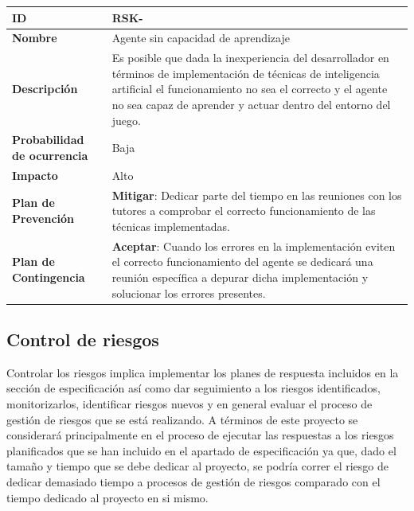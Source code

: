\begin{center}
	\begin{tabular}{ | p{5.6cm} | p{8.5cm} | } 
		\hline
		
		\textbf{ID} & RSK-\arabic{contador_riesgos}
		{contador_riesgos} \\
		
		\hline 
		\textbf{Nombre} &
		Agente sin capacidad de aprendizaje\\ 
		
		\hline
		\textbf{Descripción} & 
		Es posible que dada la inexperiencia del desarrollador en términos de implementación de técnicas de inteligencia artificial el funcionamiento no sea el correcto y el agente no sea capaz de aprender y actuar dentro del entorno del juego.\\
		
		\hline 
		\textbf{Probabilidad de ocurrencia} &
		Baja\\
		
		\hline 
		\textbf{Impacto} &
		Alto\\
		
		\hline 
		\textbf{Plan de Prevención} &
		\textbf{Mitigar}: Dedicar parte del tiempo en las reuniones con los tutores a comprobar el correcto funcionamiento de las técnicas implementadas.\\
		
		\hline 
		\textbf{Plan de Contingencia} &
		\textbf{Aceptar}: Cuando los errores en la implementación eviten el correcto funcionamiento del agente se dedicará una reunión específica a depurar dicha implementación y solucionar los errores presentes.\\
		
		
		\hline
	\end{tabular}
\end{center}

\subsection{Control de riesgos}

Controlar los riesgos implica implementar los planes de respuesta incluidos en la sección de especificación así como dar seguimiento a los riesgos identificados, monitorizarlos, identificar riesgos nuevos y en general evaluar el proceso de gestión de riesgos que se está realizando. A términos de este proyecto se considerará principalmente en el proceso de ejecutar las respuestas a los riesgos planificados que se han incluido en el apartado de especificación ya que, dado el tamaño y tiempo que se debe dedicar al proyecto, se podría correr el riesgo de dedicar demasiado tiempo a procesos de gestión de riesgos comparado con el tiempo dedicado al proyecto en si mismo.

